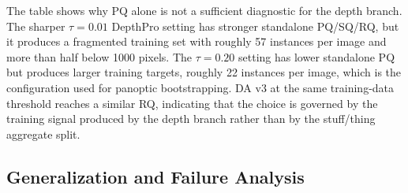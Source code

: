 \documentclass{article}
\begin{document}
The table shows why PQ alone is not a sufficient diagnostic for the depth branch. The sharper $\tau = 0.01$ DepthPro setting has stronger standalone PQ/SQ/RQ, but it produces a fragmented training set with roughly 57 instances per image and more than half below 1000 pixels. The $\tau = 0.20$ setting has lower standalone PQ but produces larger training targets, roughly 22 instances per image, which is the configuration used for panoptic bootstrapping. DA v3 at the same training-data threshold reaches a similar RQ, indicating that the choice is governed by the training signal produced by the depth branch rather than by the stuff/thing aggregate split.


\subsection{Generalization and Failure Analysis}
\label{sec:exp:generalization}
\end{document}
